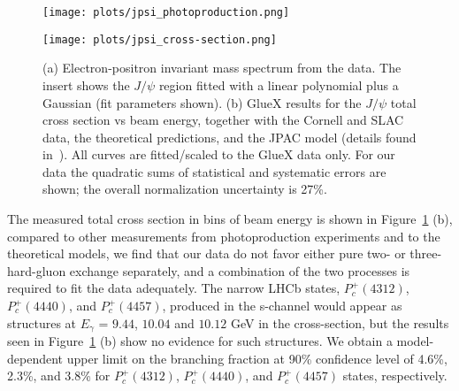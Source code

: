 \documentclass[a4paper]{jpconf}
\begin{document}
\begin{figure}[h]
    \centering
    \begin{minipage}{16pc}
        \texttt{[image: plots/jpsi\_photoproduction.png]}
    \end{minipage}\hspace{3pc}%
    \begin{minipage}{16pc}
        \texttt{[image: plots/jpsi\_cross-section.png]}
    \end{minipage}
    \caption{\label{fig.4} (a) Electron-positron invariant mass spectrum from the data. The insert shows the $J/\psi$ region fitted with a linear polynomial plus a Gaussian (fit parameters shown). (b) GlueX results for the $J/\psi$ total cross section vs beam energy, together with the Cornell and SLAC data, the theoretical predictions, and the JPAC model (details found in~\cite{ref.5}). All curves are fitted/scaled to the GlueX data only. For our data the quadratic sums of statistical and systematic errors are shown; the overall normalization uncertainty is 27\%.}
\end{figure}

The measured total cross section in bins of beam energy is shown in Figure~\ref{fig.4} (b), compared to other measurements from photoproduction experiments and to the theoretical models, we find that our data do not favor either pure two- or three-hard-gluon exchange separately, and a combination of the two processes is required to fit the data adequately.
The narrow LHCb states, $P^{+}_{c}(4312)$, $P^{+}_{c}(4440)$, and $P^{+}_{c}(4457)$, produced in the s-channel would appear as structures at $E_{\gamma}$ = $9.44$, $10.04$ and $10.12$ GeV in the cross-section, but the results seen in Figure~\ref{fig.4} (b) show no evidence for such structures. We obtain a model-dependent upper limit on the branching fraction at 90\% confidence level of 4.6\%, 2.3\%, and 3.8\% for $P^{+}_{c}(4312)$, $P^{+}_{c}(4440)$, and $P^{+}_{c}(4457)$ states, respectively.
\end{document}
